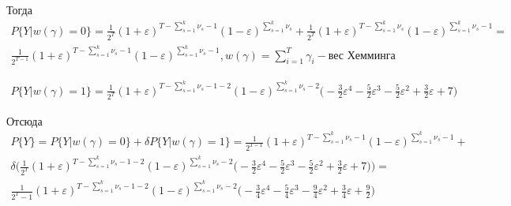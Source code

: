 \documentclass[a4paper,12pt]{article}
\theoremstyle{plain}
\begin{document}
    Тогда 
    \begin{gather*}
    P\{Y|w(\gamma)=0\}=\frac{1}{2^T}(1+\varepsilon)^{T-\sum\limits_{s=1}^{k}\nu_s-1} (1-\varepsilon)^{\sum\limits_{s=1}^{k}\nu_s}+\frac{1}{2^T}(1+\varepsilon)^{T-\sum\limits_{s=1}^{k}\nu_s} (1-\varepsilon)^{\sum\limits_{s=1}^{k}\nu_s-1}=\\ \frac{1}{2^{T-1}}(1+\varepsilon)^{T-\sum\limits_{s=1}^{k}\nu_s-1} (1-\varepsilon)^{\sum\limits_{s=1}^{k}\nu_s-1}, w(\gamma)=\sum\limits_{i=1}^{T}\gamma_i - \text{вес Хемминга}
    \end{gather*}
    
    \begin{gather*}
    P\{Y|w(\gamma)=1\}=\frac{1}{2^T}(1+\varepsilon)^{T-\sum\limits_{s=1}^{k}\nu_s-1-2} (1-\varepsilon)^{\sum\limits_{s=1}^{k}\nu_s-2}\bigl(-\frac{3}{2}\varepsilon^4-\frac{5}{2}\varepsilon^3-\frac{5}{2}\varepsilon^2+\frac{3}{2}\varepsilon + 7\bigl)
    \end{gather*}
    
    Отсюда 
    \begin{gather*}
    P\{Y\}=P\{Y|w(\gamma)=0\} + \delta P\{Y|w(\gamma)=1\}= \frac{1}{2^{T-1}}(1+\varepsilon)^{T-\sum\limits_{s=1}^{k}\nu_s-1} (1-\varepsilon)^{\sum\limits_{s=1}^{k}\nu_s-1} +\\ \delta \biggl( \frac{1}{2^T}(1+\varepsilon)^{T-\sum\limits_{s=1}^{k}\nu_s-1-2} (1-\varepsilon)^{\sum\limits_{s=1}^{k}\nu_s-2}\bigl(-\frac{3}{2}\varepsilon^4-\frac{5}{2}\varepsilon^3-\frac{5}{2}\varepsilon^2+\frac{3}{2}\varepsilon + 7\bigl) \biggl) = \\
    \frac{1}{2^T-1}(1+\varepsilon)^{T-\sum\limits_{s=1}^{k}\nu_s-1-2} (1-\varepsilon)^{\sum\limits_{s=1}^{k}\nu_s-2}\bigl(-\frac{3}{4}\varepsilon^4-\frac{5}{4}\varepsilon^3-\frac{9}{4}\varepsilon^2+\frac{3}{4}\varepsilon + \frac{9}{2}\bigl)
    \end{gather*}
    
    
    
    
  


 
\end{document}
